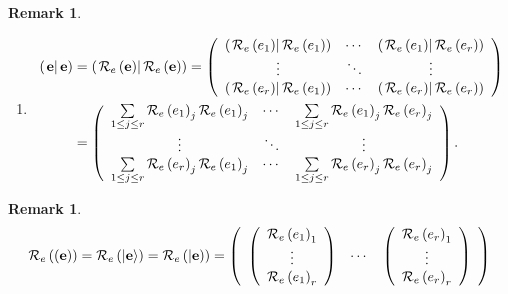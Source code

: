 \documentclass[aps,preprint]{revtex4}%
\newtheorem{remark}[theorem]{Remark}
\begin{document}
\begin{remark}
\begin{enumerate}
\item
\begin{align}
\left(  \left.  \mathbf{e}\right\vert \mathbf{e}\right)   &  =\left(  \left.
\mathcal{R}_{e}\left(  \mathbf{e}\right)  \right\vert \mathcal{R}_{e}\left(
\mathbf{e}\right)  \right)  =\left(
\begin{array}
[c]{ccc}%
\left(  \left.  \mathcal{R}_{e}\left(  e_{1}\right)  \right\vert
\mathcal{R}_{e}\left(  e_{1}\right)  \right)  & \cdots & \left(  \left.
\mathcal{R}_{e}\left(  e_{1}\right)  \right\vert \mathcal{R}_{e}\left(
e_{r}\right)  \right) \\
\vdots & \ddots & \vdots\\
\left(  \left.  \mathcal{R}_{e}\left(  e_{r}\right)  \right\vert
\mathcal{R}_{e}\left(  e_{1}\right)  \right)  & \cdots & \left(  \left.
\mathcal{R}_{e}\left(  e_{r}\right)  \right\vert \mathcal{R}_{e}\left(
e_{r}\right)  \right)
\end{array}
\right) \\
&  =\left(
\begin{array}
[c]{ccc}%
\sum\limits_{1\leq j\leq r}\mathcal{R}_{e}\left(  e_{1}\right)  _{j}%
\mathcal{R}_{e}\left(  e_{1}\right)  _{j} & \cdots & \sum\limits_{1\leq j\leq
r}\mathcal{R}_{e}\left(  e_{1}\right)  _{j}\mathcal{R}_{e}\left(
e_{r}\right)  _{j}\\
\vdots & \ddots & \vdots\\
\sum\limits_{1\leq j\leq r}\mathcal{R}_{e}\left(  e_{r}\right)  _{j}%
\mathcal{R}_{e}\left(  e_{1}\right)  _{j} & \cdots & \sum\limits_{1\leq j\leq
r}\mathcal{R}_{e}\left(  e_{r}\right)  _{j}\mathcal{R}_{e}\left(
e_{r}\right)  _{j}%
\end{array}
\right)  .
\end{align}

\end{enumerate}
\end{remark}

\begin{remark}%
\begin{equation}
\mathcal{R}_{e}\left(  \left(  \mathbf{e}\right)  \right)  =\mathcal{R}%
_{e}\left(  \left\vert \mathbf{e}\right\rangle \right)  =\mathcal{R}%
_{e}\left(  \left\vert \mathbf{e}\right)  \right)  =\left(
\begin{array}
[c]{ccc}%
\left(
\begin{array}
[c]{c}%
\mathcal{R}_{e}\left(  e_{1}\right)  _{1}\\
\vdots\\
\mathcal{R}_{e}\left(  e_{1}\right)  _{r}%
\end{array}
\right)  & \cdots & \left(
\begin{array}
[c]{c}%
\mathcal{R}_{e}\left(  e_{r}\right)  _{1}\\
\vdots\\
\mathcal{R}_{e}\left(  e_{r}\right)  _{r}%
\end{array}
\right)
\end{array}
\right)
\end{equation}

\end{remark}
\end{document}
